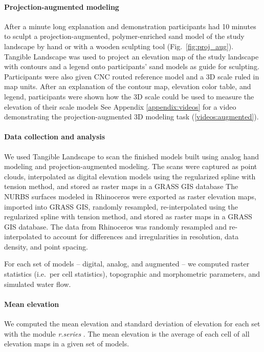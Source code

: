 \documentclass[prodmode,acmtochi]{acmsmall} %
\begin{document}
\paragraph{Projection-augmented modeling}
After a minute long explanation and demonstration
participants had 10 minutes to sculpt
a projection-augmented, polymer-enriched sand model
of the study landscape by hand or with a wooden sculpting tool 
(Fig.~\ref{fig:proj_aug}). 
Tangible Landscape was used to project 
an elevation map of the study landscape
with contours and a legend
onto participants' sand models as guide for sculpting. 
Participants were also given CNC routed reference model and 
a 3D scale ruled in map units. 
After an explanation of the contour map, elevation color table, and legend,
participants were shown how the 3D scale could be used to 
measure the elevation of their scale models
%
See Appendix \ref{appendix:videos}
for a video demonstrating the projection-augmented 3D modeling task (\ref{videos:augmented}).

\paragraph{Data collection and analysis}
We used Tangible Landscape to scan the finished models 
built using analog hand modeling and projection-augmented modeling.
The scans were captured as point clouds, interpolated 
as digital elevation models using the regularized spline with tension method,
and stored as raster maps in a GRASS GIS database 
The NURBS surfaces modeled in Rhinoceros were exported as raster elevation maps,
imported into GRASS GIS, randomly resampled, 
re-interpolated using the regularized spline with tension method, 
and stored as raster maps in a GRASS GIS database. 
The data from Rhinoceros was randomly resampled and re-interpolated
to account for differences and irregularities in resolution, data density, and point spacing.

For each set of models -- digital, analog, and augmented --
we computed raster statistics (i.e.~per cell statistics), 
topographic and morphometric parameters, 
and simulated water flow.

\paragraph{Mean elevation}
We computed 
the mean elevation 
and standard deviation of elevation
for each set
with the module \textit{r.series} \cite{r.series}.
The mean elevation is the average of each cell 
of all elevation maps in a given set of models.
\end{document}
